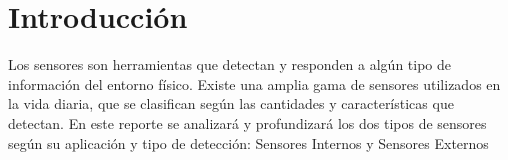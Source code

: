 \section{Introducción}
	Los sensores son herramientas que detectan y responden a algún tipo de información del entorno físico. Existe una amplia gama de sensores utilizados en la vida diaria, que se clasifican según las cantidades y características que detectan. En este reporte se analizará y profundizará los dos tipos de sensores según su aplicación y tipo de detección: Sensores Internos y Sensores Externos